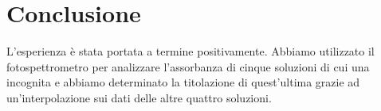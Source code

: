 \section*{Conclusione}

L'esperienza è stata portata a termine positivamente. Abbiamo utilizzato il fotospettrometro per analizzare l'assorbanza di cinque soluzioni di cui una incognita e abbiamo determinato la titolazione di quest'ultima grazie ad un'interpolazione sui dati delle altre quattro soluzioni.
